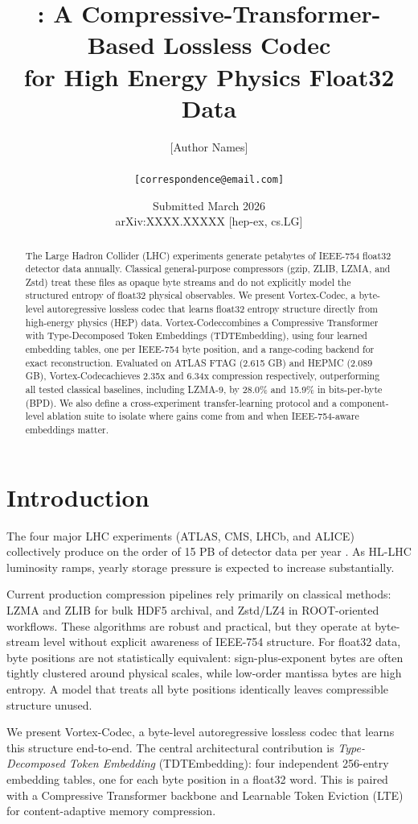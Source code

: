 \documentclass[10pt,twocolumn]{article}
\title{\textbf{\codec: A Compressive-Transformer-Based Lossless Codec\\for High Energy Physics Float32 Data}}
\author{[Author Names]\\[Institution(s)]\\\texttt{[correspondence@email.com]}}
\date{Submitted March 2026\\arXiv:XXXX.XXXXX [hep-ex, cs.LG]}
\newcommand{\codec}{Vortex-Codec}
\begin{document}
\maketitle

\begin{abstract}
The Large Hadron Collider (LHC) experiments generate petabytes of IEEE-754 float32 detector data annually. Classical general-purpose compressors (gzip, ZLIB, LZMA, and Zstd) treat these files as opaque byte streams and do not explicitly model the structured entropy of float32 physical observables. We present \codec, a byte-level autoregressive lossless codec that learns float32 entropy structure directly from high-energy physics (HEP) data. \codec combines a Compressive Transformer with Type-Decomposed Token Embeddings (TDTEmbedding), using four learned embedding tables, one per IEEE-754 byte position, and a range-coding backend for exact reconstruction. Evaluated on ATLAS FTAG (2.615 GB) and HEPMC (2.089 GB), \codec achieves 2.35x and 6.34x compression respectively, outperforming all tested classical baselines, including LZMA-9, by 28.0\% and 15.9\% in bits-per-byte (BPD). We also define a cross-experiment transfer-learning protocol and a component-level ablation suite to isolate where gains come from and when IEEE-754-aware embeddings matter.
\end{abstract}

\section{Introduction}
The four major LHC experiments (ATLAS, CMS, LHCb, and ALICE) collectively produce on the order of 15 PB of detector data per year \cite{cern_lhc}. As HL-LHC luminosity ramps, yearly storage pressure is expected to increase substantially.

Current production compression pipelines rely primarily on classical methods: LZMA and ZLIB for bulk HDF5 archival, and Zstd/LZ4 in ROOT-oriented workflows. These algorithms are robust and practical, but they operate at byte-stream level without explicit awareness of IEEE-754 structure. For float32 data, byte positions are not statistically equivalent: sign-plus-exponent bytes are often tightly clustered around physical scales, while low-order mantissa bytes are high entropy. A model that treats all byte positions identically leaves compressible structure unused.

We present \codec, a byte-level autoregressive lossless codec that learns this structure end-to-end. The central architectural contribution is \emph{Type-Decomposed Token Embedding} (TDTEmbedding): four independent 256-entry embedding tables, one for each byte position in a float32 word. This is paired with a Compressive Transformer backbone \cite{compressive_transformer} and Learnable Token Eviction (LTE) \cite{infini_lte} for content-adaptive memory compression.
\end{document}
